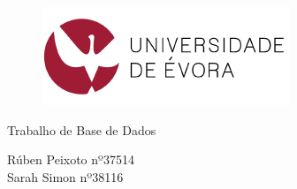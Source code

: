 \documentclass[12pt]{article}
\begin{document}
\begin{titlepage}
\begin{center}
\begin{figure}[htp]
\begin{center}
\includegraphics[scale=1.5]{image.jpg}
\end{center}
\end{figure}
\begin{huge}
Trabalho de Base de Dados\\
\end{huge}
Rúben Peixoto nº37514\\
Sarah Simon nº38116\\
\end{center}
\end{titlepage}
\end{document}
